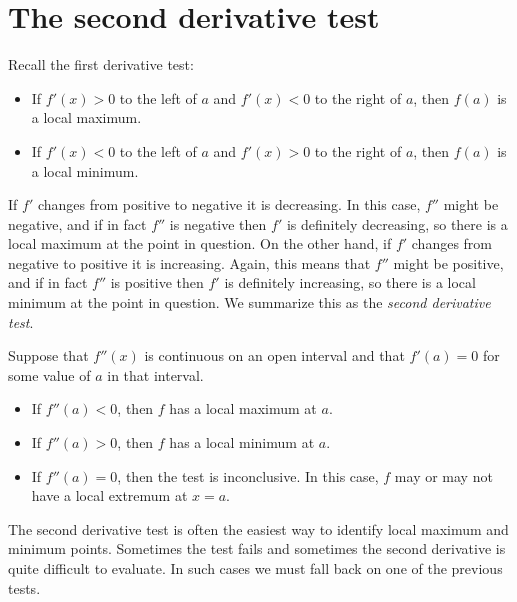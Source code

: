 \documentclass{ximera}
\begin{document}
\section{The second derivative test}


Recall the first derivative test:
\begin{itemize}
\item If $f'(x)>0$ to the left of $a$ and $f'(x)<0$ to the right of
  $a$, then $f(a)$ is a local maximum.
\item If $f'(x)<0$ to the left of $a$ and $f'(x)>0$ to the right of
  $a$, then $f(a)$ is a local minimum.
\end{itemize}

If $f'$ changes from positive to negative it is decreasing. In this
case, $f''$ might be negative, and if in fact $f''$ is negative
then $f'$ is definitely decreasing, so there is a local maximum at
the point in question. On the other hand, if $f'$ changes from
negative to positive it is increasing. Again, this means that
$f''$ might be positive, and if in fact $f''$ is positive then
$f'$ is definitely increasing, so there is a local minimum at the
point in question. We summarize this as the \textit{second derivative
  test}.

\begin{theorem}\label{T:sdt}
	Suppose that $f''(x)$ is continuous on an open interval and that
	$f'(a)=0$ for some value of $a$ in that interval.
	\begin{itemize}
		\item If $f''(a) <0$, then $f$ has a local maximum at $a$.
		\item If $f''(a) >0$, then $f$ has a local minimum at $a$.
		\item If $f''(a) =0$, then the test is inconclusive. In this case, $f$ may or may not have a local extremum at $x=a$.
	\end{itemize}
\end{theorem}


The second derivative test is often the easiest way to identify local
maximum and minimum points. Sometimes the test fails and sometimes
the second derivative is quite difficult to evaluate. In such cases we
must fall back on one of the previous tests.
\end{document}
